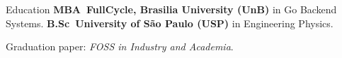 \begin{rubric}{Education}
\entry*[2023 - current]
   \textbf{MBA~FullCycle, Brasilia University (UnB)} in Go Backend Systems.
\entry*[2016 -- 2022]%
	\textbf{B.Sc~University of São Paulo (USP)} in Engineering Physics.\par
	Graduation paper: \emph{FOSS in Industry and Academia}.
\end{rubric}
